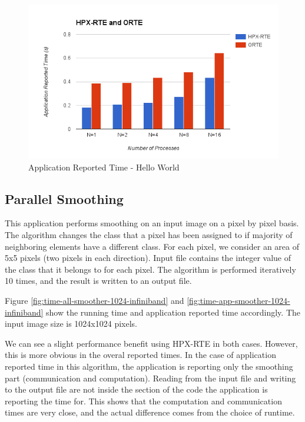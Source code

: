 \begin{figure}[h!]
\centering
\includegraphics[scale=0.7]{images/time-app-hello-world-infiniband.png}
\caption[Application Reported Time - Hello World]{Application Reported Time - Hello World}
\label{fig:time-app-hello-world-infiniband}
\end{figure}


\subsection{Parallel Smoothing}
This application performs smoothing on an input image on a pixel by pixel basis. The algorithm changes the class that a pixel has been assigned to if majority of neighboring elements have a different class. For each pixel, we consider an area of 5x5 pixels (two pixels in each direction). Input file contains the integer value of the class that it belongs to for each pixel. The algorithm is performed iteratively 10 times, and the result is written to an output file.

Figure \ref{fig:time-all-smoother-1024-infiniband} and \ref{fig:time-app-smoother-1024-infiniband} show the running time and application reported time accordingly. The input image size is 1024x1024 pixels.

We can see a slight performance benefit using HPX-RTE in both cases. However, this is more obvious in the overal reported times. In the case of application reported time in this algorithm, the application is reporting only the smoothing part (communication and computation). Reading from the input file and writing to the output file are not inside the section of the code the application is reporting the time for. This shows that the computation and communication times are very close, and the actual difference comes from the choice of runtime.

